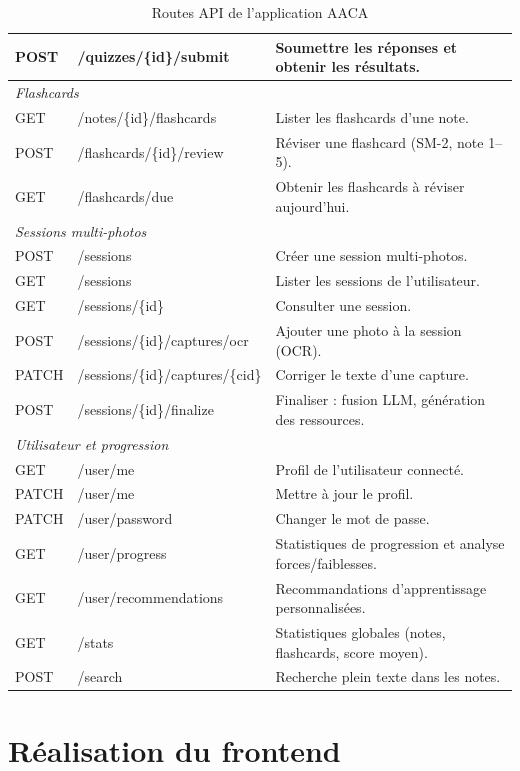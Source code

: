 \documentclass[12pt,a4paper]{report}
\begin{document}
\begin{table}[H]
\begin{tabularx}{\textwidth}{|p{1.5cm}|p{5.5cm}|X|}
POST & /quizzes/\{id\}/submit & Soumettre les réponses et obtenir les résultats.\\
\hline
\multicolumn{3}{|l|}{\textit{Flashcards}}\\
\hline
GET & /notes/\{id\}/flashcards & Lister les flashcards d'une note.\\
POST & /flashcards/\{id\}/review & Réviser une flashcard (SM-2, note 1--5).\\
GET & /flashcards/due & Obtenir les flashcards à réviser aujourd'hui.\\
\hline
\multicolumn{3}{|l|}{\textit{Sessions multi-photos}}\\
\hline
POST & /sessions & Créer une session multi-photos.\\
GET & /sessions & Lister les sessions de l'utilisateur.\\
GET & /sessions/\{id\} & Consulter une session.\\
POST & /sessions/\{id\}/captures/ocr & Ajouter une photo à la session (OCR).\\
PATCH & /sessions/\{id\}/captures/\{cid\} & Corriger le texte d'une capture.\\
POST & /sessions/\{id\}/finalize & Finaliser : fusion LLM, génération des ressources.\\
\hline
\multicolumn{3}{|l|}{\textit{Utilisateur et progression}}\\
\hline
GET & /user/me & Profil de l'utilisateur connecté.\\
PATCH & /user/me & Mettre à jour le profil.\\
PATCH & /user/password & Changer le mot de passe.\\
GET & /user/progress & Statistiques de progression et analyse forces/faiblesses.\\
GET & /user/recommendations & Recommandations d'apprentissage personnalisées.\\
GET & /stats & Statistiques globales (notes, flashcards, score moyen).\\
POST & /search & Recherche plein texte dans les notes.\\
\hline
\end{tabularx}
\caption{Routes API de l'application AACA}
\label{tab:api}
\end{table}

\section{Réalisation du frontend}
\end{document}
